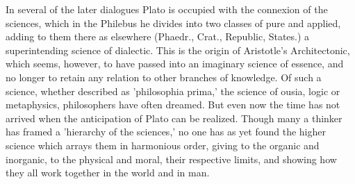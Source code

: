 \documentclass[11pt,letter]{article}
\begin{document}
\par  In several of the later dialogues Plato is occupied with the connexion of the sciences, which in the Philebus he divides into two classes of pure and applied, adding to them there as elsewhere (Phaedr., Crat., Republic, States.) a superintending science of dialectic. This is the origin of Aristotle's Architectonic, which seems, however, to have passed into an imaginary science of essence, and no longer to retain any relation to other branches of knowledge. Of such a science, whether described as 'philosophia prima,' the science of ousia, logic or metaphysics, philosophers have often dreamed. But even now the time has not arrived when the anticipation of Plato can be realized. Though many a thinker has framed a 'hierarchy of the sciences,' no one has as yet found the higher science which arrays them in harmonious order, giving to the organic and inorganic, to the physical and moral, their respective limits, and showing how they all work together in the world and in man.
\end{document}
